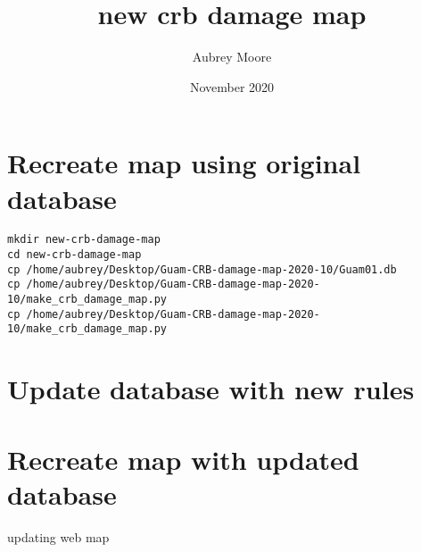 \documentclass{scrartcl}
\title{new crb damage map}
\author{Aubrey Moore}
\date{November 2020}
\begin{document}
\maketitle

\section{Recreate map using original database}

\begin{verbatim}
mkdir new-crb-damage-map
cd new-crb-damage-map
cp /home/aubrey/Desktop/Guam-CRB-damage-map-2020-10/Guam01.db
cp /home/aubrey/Desktop/Guam-CRB-damage-map-2020-10/make_crb_damage_map.py
cp /home/aubrey/Desktop/Guam-CRB-damage-map-2020-10/make_crb_damage_map.py
\end{verbatim}

\section{Update database with new rules}

\section{Recreate map with updated database}

updating web map
\end{document}
